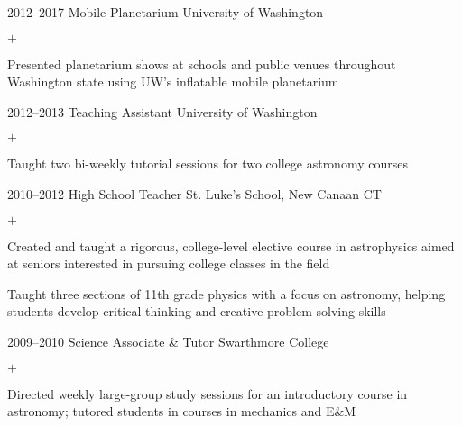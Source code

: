 \documentclass[]{luger-cv} %
\begin{document}
\begin{entrylist}


\entry
{2012--2017}
{Mobile Planetarium}
{University of Washington}
{%
\vspace{-1em}
\begin{list}{$+$}{\cvlist}
\item Presented planetarium shows at schools and public venues throughout
Washington state using UW's inflatable mobile planetarium
\end{list}
}


\entry
{2012--2013}
{Teaching Assistant}
{University of Washington}
{%
\vspace{-1em}
\begin{list}{$+$}{\cvlist}
\item Taught two bi-weekly tutorial sessions for two college astronomy courses
\end{list}
}


\ifdefined \onepage \else
\end{entrylist}
%
%
\begin{entrylist}
\fi


\entry
{2010--2012}
{High School Teacher}
{St. Luke's School, New Canaan CT}
{%
\vspace{-1em}
\begin{list}{$+$}{\cvlist}
\item Created and taught a rigorous, college-level elective course in astrophysics
aimed at seniors interested in pursuing college classes in the field
\item Taught three sections of 11th grade physics with a focus on
astronomy, helping students develop critical thinking and creative
problem solving skills
\end{list}
}

%

\ifdefined \onepage \else
\entry
{2009--2010}
{Science Associate \& Tutor}
{Swarthmore College}
{%
\vspace{-1em}
\begin{list}{$+$}{\cvlist}
\item Directed weekly large-group study sessions for an introductory course in
astronomy; tutored students in courses in mechanics and E\&M
\end{list}
}
\fi


\end{entrylist}
\end{document}
